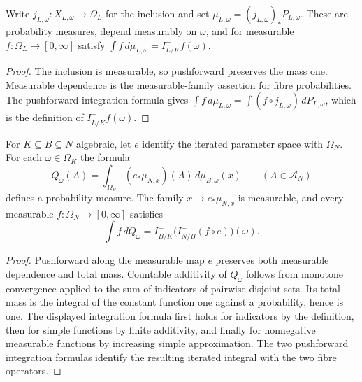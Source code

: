 \begin{definition}\label{def:algebraic-total-fibre-probability}
\leanok
{}
Write $j_{L,\omega}:X_{L,\omega}\to\Omega_L$ for the inclusion and set
$\mu_{L,\omega}=(j_{L,\omega})_*P_{L,\omega}$. These are probability
measures, depend measurably on $\omega$, and for measurable
$f:\Omega_L\to[0,\infty]$ satisfy
$\int f\,d\mu_{L,\omega}=I^+_{L/K}f(\omega)$.
\end{definition}
\begin{proof}
The inclusion is measurable, so pushforward preserves the mass one.
Measurable dependence is the measurable-family assertion for fibre
probabilities. The pushforward integration formula gives
$\int f\,d\mu_{L,\omega}=\int(f\circ j_{L,\omega})\,dP_{L,\omega}$,
which is the definition of $I^+_{L/K}f(\omega)$.
\end{proof}

\begin{definition}\label{def:algebraic-tower-probability}
\leanok
{}
For $K\subseteq B\subseteq N$ algebraic, let $e$ identify the iterated
parameter space with $\Omega_N$. For each $\omega\in\Omega_K$ the formula
\[
 Q_\omega(A)=\int_{\Omega_B}
       (e_*\mu_{N,x})(A)\,d\mu_{B,\omega}(x)
       \qquad(A\in\mathcal A_N)
\]
defines a probability measure. The family $x\mapsto e_*\mu_{N,x}$ is
measurable, and every measurable $f:\Omega_N\to[0,\infty]$ satisfies
\[
 \int f\,dQ_\omega
 =I^+_{B/K}\bigl(I^+_{N/B}(f\circ e)\bigr)(\omega).
\]
\end{definition}
\begin{proof}
Pushforward along the measurable map $e$ preserves both measurable
dependence and total mass. Countable additivity of $Q_\omega$ follows
from monotone convergence applied to the sum of indicators of
pairwise disjoint sets. Its total mass is the integral of the
constant function one against a probability, hence is one.
The displayed integration formula first holds for indicators by the
definition, then for simple functions by finite additivity, and finally
for nonnegative measurable functions by increasing simple approximation.
The two pushforward integration formulas identify the resulting
iterated integral with the two fibre operators.
\end{proof}

